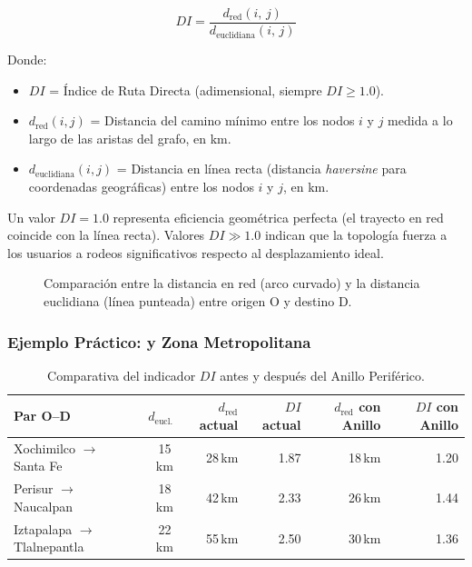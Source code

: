 \begin{equation}
    DI = \frac{d_{\text{red}}(i,\, j)}{d_{\text{euclidiana}}(i,\, j)}
    \label{eq:detour-factor}
\end{equation}

Donde:
\begin{itemize}
    \item $DI$ = Índice de Ruta Directa (adimensional, siempre $DI \geq 1.0$).
    \item $d_{\text{red}}(i, j)$ = Distancia del camino mínimo entre los nodos $i$
    y $j$ medida a lo largo de las aristas del grafo, en km.
    \item $d_{\text{euclidiana}}(i, j)$ = Distancia en línea recta (distancia
    \textit{haversine} para coordenadas geográficas) entre los nodos $i$ y $j$,
    en km.
\end{itemize}

Un valor $DI = 1.0$ representa eficiencia geométrica perfecta (el trayecto en red
coincide con la línea recta). Valores $DI \gg 1.0$ indican que la topología fuerza
a los usuarios a rodeos significativos respecto al desplazamiento ideal.

\begin{figure}[H]
    \centering
    \caption[Diagrama del \textit{Detour Factor} $DI$]{Comparación entre la
    distancia en red (arco curvado) y la distancia euclidiana (línea punteada)
    entre origen O y destino D.}
    \label{fig:indicador-DI}
\end{figure}

\subsubsection{Ejemplo Práctico: \cdmx{} y Zona Metropolitana}

\begin{table}[H]
    \centering
    \caption{Comparativa del indicador $DI$ antes y después del Anillo Periférico.}
    \label{tab:detour-factor}
    \begin{tabularx}{\textwidth}{X r r r r r}
        \toprule
        \textbf{Par O--D} &
        $d_{\text{eucl.}}$ &
        $d_{\text{red}}$ actual &
        $DI$ actual &
        $d_{\text{red}}$ con Anillo &
        $DI$ con Anillo \\
        \midrule
        Xochimilco $\to$ Santa Fe    & 15\,km & 28\,km & 1.87 & 18\,km & 1.20 \\
        Perisur $\to$ Naucalpan      & 18\,km & 42\,km & 2.33 & 26\,km & 1.44 \\
        Iztapalapa $\to$ Tlalnepantla & 22\,km & 55\,km & 2.50 & 30\,km & 1.36 \\
        \bottomrule
    \end{tabularx}
\end{table}

